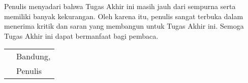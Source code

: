 
Penulis menyadari bahwa Tugas Akhir ini masih jauh dari sempurna serta memiliki banyak kekurangan. Oleh karena itu, penulis sangat terbuka dalam menerima kritik dan saran yang membangun untuk Tugas Akhir ini. Semoga Tugas Akhir ini dapat bermanfaat bagi pembaca.

\vspace{15mm}
\begin{tabularx}{\textwidth}{l@{\hskip 0.5\textwidth}l}
	 & Bandung, \thedate{} \yearsidang{} \\
	 & Penulis
\end{tabularx}
